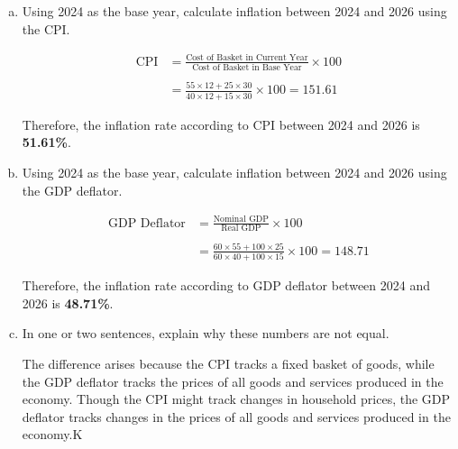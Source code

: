 \documentclass{article}
\begin{document}
\begin{enumerate}[(a)]
    \item Using 2024 as the base year, calculate inflation between 2024 and 2026 using the CPI.
    
    \begin{align*}
        \text{CPI} &= \frac{\text{Cost of Basket in Current Year}}{\text{Cost of Basket in Base Year}} \times 100\\\\
        &= \frac{55 \times 12 + 25 \times 30}{40 \times 12 + 15 \times 30} \times 100 = 151.61
    \end{align*}

    Therefore, the inflation rate according to CPI between 2024 and 2026 is \textbf{51.61\%}.

    \item Using 2024 as the base year, calculate inflation between 2024 and 2026 using the GDP deflator.
    
    \begin{align*}
        \text{GDP Deflator} &= \frac{\text{Nominal GDP}}{\text{Real GDP}} \times 100\\\\
        &= \frac{60 \times 55 + 100 \times 25}{60 \times 40 + 100 \times 15} \times 100 = 148.71
    \end{align*}

    Therefore, the inflation rate according to GDP deflator between 2024 and 2026 is \textbf{48.71\%}.

    \item In one or two sentences, explain why these numbers are not equal.
    
    The difference arises because the CPI tracks a fixed basket of goods, while the GDP deflator tracks the prices of all goods and services produced in the economy. Though the CPI might track changes in household prices, the GDP deflator tracks changes in the prices of all goods and services produced in the economy.K

\end{enumerate}
\end{document}
